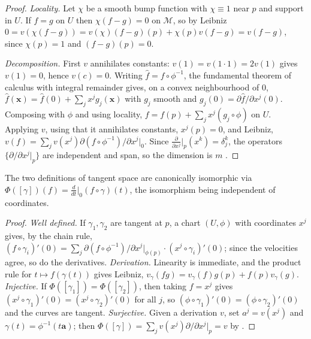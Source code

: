 \begin{proof}
\emph{Locality.} Let $\chi$ be a smooth bump function with $\chi \equiv 1$ near
$p$ and support in $U$. If $f = g$ on $U$ then $\chi(f-g) = 0$ on $\mathcal{M}$,
so by Leibniz $0 = v(\chi(f-g)) = v(\chi)(f-g)(p) + \chi(p)v(f-g) = v(f-g)$, since
$\chi(p) = 1$ and $(f-g)(p) = 0$.

\emph{Decomposition.} First $v$ annihilates constants: $v(1) = v(1\cdot 1) =
2v(1)$ gives $v(1) = 0$, hence $v(c) = 0$. Writing $\hat f = f\circ\phi^{-1}$, the
fundamental theorem of calculus with integral remainder gives, on a convex
neighbourhood of $0$,
$\hat f(\mathbf{x}) = \hat f(0) + \sum_j x^j g_j(\mathbf{x})$ with $g_j$ smooth
and $g_j(0) = \partial\hat f/\partial x^j(0)$. Composing with $\phi$ and using
locality, $f = f(p) + \sum_j x^j (g_j\circ\phi)$ on $U$. Applying $v$, using that
it annihilates constants, $x^j(p) = 0$, and Leibniz, $v(f) = \sum_j v(x^j)
\partial(f\circ\phi^{-1})/\partial x^j|_0$. Since
$\frac{\partial}{\partial x^j}|_p(x^k) = \delta_j^k$, the operators
$\{\partial/\partial x^j|_p\}$ are independent and span, so the dimension is $m$
\citep[Prop.~3.2]{lee2012introduction}.
\end{proof}

\begin{proposition}
\label{prop:found:tangent-equiv}
The two definitions of tangent space are canonically isomorphic via
$\Phi([\gamma])(f) = \frac{d}{dt}\big|_0 (f\circ\gamma)(t)$, the isomorphism
being independent of coordinates.
\end{proposition}

\begin{proof}
\emph{Well defined.} If $\gamma_1, \gamma_2$ are tangent at $p$, a chart
$(U,\phi)$ with coordinates $x^j$ gives, by the chain rule,
$(f\circ\gamma_i)'(0) = \sum_j \partial(f\circ\phi^{-1})/\partial x^j|_{\phi(p)}
\cdot (x^j\circ\gamma_i)'(0)$; since the velocities agree, so do the derivatives.
\emph{Derivation.} Linearity is immediate, and the product rule for
$t \mapsto f(\gamma(t))$ gives Leibniz, $v_\gamma(fg) = v_\gamma(f)g(p) +
f(p)v_\gamma(g)$. \emph{Injective.} If $\Phi([\gamma_1]) = \Phi([\gamma_2])$, then
taking $f = x^j$ gives $(x^j\circ\gamma_1)'(0) = (x^j\circ\gamma_2)'(0)$ for all
$j$, so $(\phi\circ\gamma_1)'(0) = (\phi\circ\gamma_2)'(0)$ and the curves are
tangent. \emph{Surjective.} Given a derivation $v$, set $a^j = v(x^j)$ and
$\gamma(t) = \phi^{-1}(t\mathbf{a})$; then $\Phi([\gamma]) = \sum_j v(x^j)
\partial/\partial x^j|_p = v$ by .
\end{proof}

